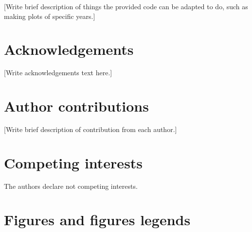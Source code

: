 \documentclass[english]{article}
\begin{document}

[Write brief description of things the provided code can be adapted to do, such as making plots of specific years.]

\section*{Acknowledgements}


[Write acknowledgements text here.]

\section*{Author contributions}


[Write brief description of contribution from each author.]

\section*{Competing interests}


The authors declare not competing interests.

\section*{Figures and figures legends}

\end{document}
